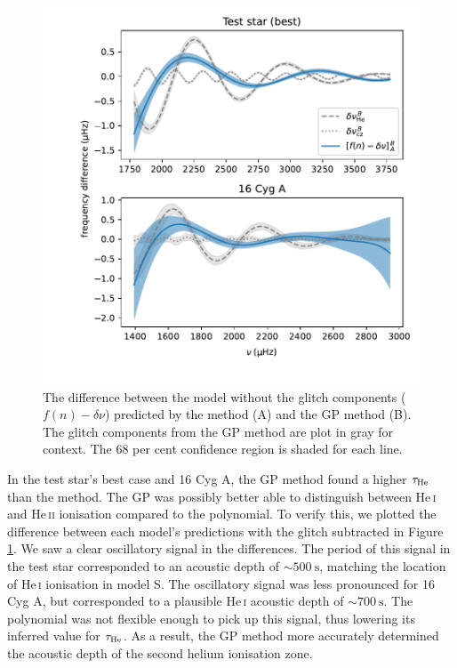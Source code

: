 \begin{figure}[!tb]
    \centering
    \includegraphics[trim={0.4in 0.2in 0 0},clip]{figures/glitch-res.pdf}
    \caption{The difference between the model without the glitch components (\(f(n) - \delta\nu\)) predicted by the  method (A) and the GP method (B). The glitch components from the GP method are plot in gray for context. The 68 per cent confidence region is shaded for each line.}
    \label{fig:smooth-res}
\end{figure}

In the test star's best case and 16 Cyg A, the GP method found a higher \(\tau_{{\mathrm{He}}}\) than the  method. The GP was possibly better able to distinguish between He\,\textsc{i} and He\,\textsc{ii} ionisation compared to the polynomial. To verify this, we plotted the difference between each model's predictions with the glitch subtracted in Figure \ref{fig:smooth-res}. We saw a clear oscillatory signal in the differences. The period of this signal in the test star corresponded to an acoustic depth of \(\sim \SI{500}{\second}\), matching the location of He\,\textsc{i} ionisation in model S. The oscillatory signal was less pronounced for 16 Cyg A, but corresponded to a plausible He\,\textsc{i} acoustic depth of \(\sim \SI{700}{\second}\). The polynomial was not flexible enough to pick up this signal, thus lowering its inferred value for \(\tau_{{\mathrm{He}}}\). As a result, the GP method more accurately determined the acoustic depth of the second helium ionisation zone.

